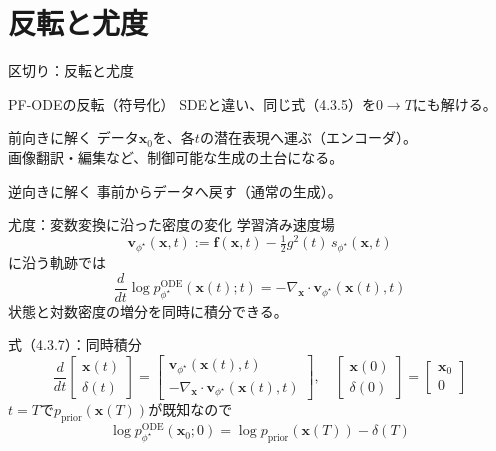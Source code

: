 \section{反転と尤度}
\asmain
\begin{frame}{区切り：反転と尤度}
    \tableofcontents[currentsection]
\end{frame}
\asmain
\begin{frame}{PF-ODEの反転（符号化）}
    SDEと違い、同じ式（4.3.5）を$0\to T$にも解ける。
    \begin{block}{前向きに解く}
        データ$\bm{x}_0$を、各$t$の潜在表現へ運ぶ（エンコーダ）。\\
        画像翻訳・編集など、制御可能な生成の土台になる。
    \end{block}
    \begin{block}{逆向きに解く}
        事前からデータへ戻す（通常の生成）。
    \end{block}
\end{frame}
\asmain
\begin{frame}{尤度：変数変換に沿った密度の変化}
    学習済み速度場
    \[
        \bm{v}_{\phi^\star}(\bm{x},t)
        :=
        \bm{f}(\bm{x},t)
        -
        \tfrac12 g^{2}(t)\,s_{\phi^\star}(\bm{x},t)
    \]
    に沿う軌跡では
    \[
        \frac{d}{dt}
        \log p_{\phi^\star}^{\mathrm{ODE}}(\bm{x}(t);t)
        =
        -\nabla_{\bm{x}}\cdot\bm{v}_{\phi^\star}(\bm{x}(t),t)
    \]
    状態と対数密度の増分を同時に積分できる。
\end{frame}
\asmain
\begin{frame}{式（4.3.7）：同時積分}
    \[
        \frac{d}{dt}
        \begin{bmatrix}
        \bm{x}(t)\\
        \delta(t)
        \end{bmatrix}
        =
        \begin{bmatrix}
        \bm{v}_{\phi^\star}(\bm{x}(t),t)\\
        -\nabla_{\bm{x}}\cdot\bm{v}_{\phi^\star}(\bm{x}(t),t)
        \end{bmatrix},
        \quad
        \begin{bmatrix}
        \bm{x}(0)\\
        \delta(0)
        \end{bmatrix}
        =
        \begin{bmatrix}
        \bm{x}_0\\
        0
        \end{bmatrix}
        \tag{4.3.7}
    \]
    $t=T$で$p_{\mathrm{prior}}(\bm{x}(T))$が既知なので
    \[
        \log p_{\phi^\star}^{\mathrm{ODE}}(\bm{x}_0;0)
        =
        \log p_{\mathrm{prior}}(\bm{x}(T))-\delta(T)
    \]
\end{frame}
